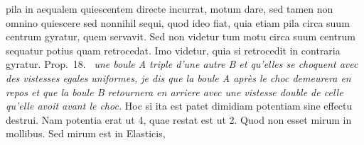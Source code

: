 %
%
pila\protect{} in aequalem quiescentem directe incurrat, motum  
%
%
dare, sed tamen
%
%
non omnino quiescere sed nonnihil sequi, quod ideo fiat, 
%
%
%
%
quia etiam pila\protect{} circa suum centrum gyratur, quem
%
%
servavit.
%
Sed non videtur tum
%
%
motu circa suum centrum%
\protect{} sequatur potius quam retrocedat.
%
Imo videtur, quia si retrocedit in contraria gyratur.
\pend 
\newpage
\count{}%
\count{}%
\count{}
\pstart
%
Prop.~18.\ 
%
%
%
\textit{une boule\protect{} \textit{A} triple d'une autre \textit{B} et qu'elles se choquent avec des vistesses 
egales}
%
%
\textit{uniformes, je dis que la boule\protect{} \textit{A} après le choc %
demeurera en repos et que la boule\protect\index{Sachverzeichnis}{boule} \textit{B} retournera %
en arriere avec une vistesse double de celle qu'elle avoit avant le choc.}
\pend
%
\pstart
Hoc si ita est patet
%
dimidiam potentiam%
\protect{} sine effectu%
\protect{} destrui. Nam %
potentia\protect{} erat ut 4, quae restat est ut 2. Quod non esset mirum
in mollibus.%
\protect{} Sed mirum est in Elasticis,%
